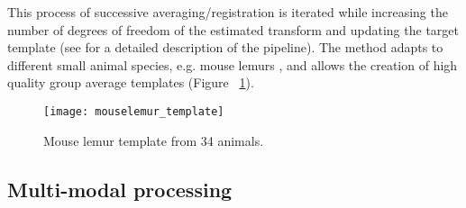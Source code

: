 \documentclass[utf8, a4paper, final, crop]{frontiersSCNS}
\begin{document}
This process of successive averaging/registration is iterated while increasing the number of degrees of 
freedom of the estimated transform and updating the target template (see \citep{nadkarni20193d} for a detailed description of the pipeline).
The method adapts to different small animal species, e.g. mouse lemurs
\citep{nadkarni2018digital}, and allows the creation of high quality
group average templates (Figure ~\ref{fig:mouse_template}).
\begin{figure}[h!]
\begin{center}
\texttt{[image: mouselemur\_template]}
\end{center}
\caption{Mouse lemur template from 34 animals.}\label{fig:mouse_template}
\end{figure}


\subsection{Multi-modal processing}
\end{document}
